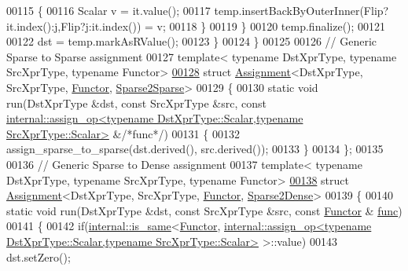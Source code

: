 \begin{DoxyCode}
00115       \{
00116         Scalar v = it.value();
00117         temp.insertBackByOuterInner(Flip?it.index():j,Flip?j:it.index()) = v;
00118       \}
00119     \}
00120     temp.finalize();
00121 
00122     dst = temp.markAsRValue();
00123   \}
00124 \}
00125 
00126 \textcolor{comment}{// Generic Sparse to Sparse assignment}
00127 \textcolor{keyword}{template}< \textcolor{keyword}{typename} DstXprType, \textcolor{keyword}{typename} SrcXprType, \textcolor{keyword}{typename} Functor>
\hyperlink{struct_eigen_1_1internal_1_1_assignment_3_01_dst_xpr_type_00_01_src_xpr_type_00_01_functor_00_01_sparse2_sparse_01_4}{00128} \textcolor{keyword}{struct }\hyperlink{struct_eigen_1_1internal_1_1_assignment}{Assignment}<DstXprType, SrcXprType, \hyperlink{struct_functor}{Functor}, 
      \hyperlink{struct_eigen_1_1internal_1_1_sparse2_sparse}{Sparse2Sparse}>
00129 \{
00130   \textcolor{keyword}{static} \textcolor{keywordtype}{void} run(DstXprType &dst, \textcolor{keyword}{const} SrcXprType &src, \textcolor{keyword}{const} 
      \hyperlink{struct_eigen_1_1internal_1_1assign__op}{internal::assign\_op<typename DstXprType::Scalar,typename SrcXprType::Scalar>}
       &\textcolor{comment}{/*func*/})
00131   \{
00132     assign\_sparse\_to\_sparse(dst.derived(), src.derived());
00133   \}
00134 \};
00135 
00136 \textcolor{comment}{// Generic Sparse to Dense assignment}
00137 \textcolor{keyword}{template}< \textcolor{keyword}{typename} DstXprType, \textcolor{keyword}{typename} SrcXprType, \textcolor{keyword}{typename} Functor>
\hyperlink{struct_eigen_1_1internal_1_1_assignment_3_01_dst_xpr_type_00_01_src_xpr_type_00_01_functor_00_01_sparse2_dense_01_4}{00138} \textcolor{keyword}{struct }\hyperlink{struct_eigen_1_1internal_1_1_assignment}{Assignment}<DstXprType, SrcXprType, \hyperlink{struct_functor}{Functor}, \hyperlink{struct_eigen_1_1internal_1_1_sparse2_dense}{Sparse2Dense}>
00139 \{
00140   \textcolor{keyword}{static} \textcolor{keywordtype}{void} run(DstXprType &dst, \textcolor{keyword}{const} SrcXprType &src, \textcolor{keyword}{const} \hyperlink{struct_functor}{Functor} &
      \hyperlink{structfunc}{func})
00141   \{
00142     \textcolor{keywordflow}{if}(\hyperlink{struct_eigen_1_1internal_1_1is__same}{internal::is\_same}<\hyperlink{struct_functor}{Functor},
      \hyperlink{struct_eigen_1_1internal_1_1assign__op}{internal::assign\_op<typename DstXprType::Scalar,typename SrcXprType::Scalar>}
       >::value)
00143       dst.setZero();

\end{DoxyCode}
